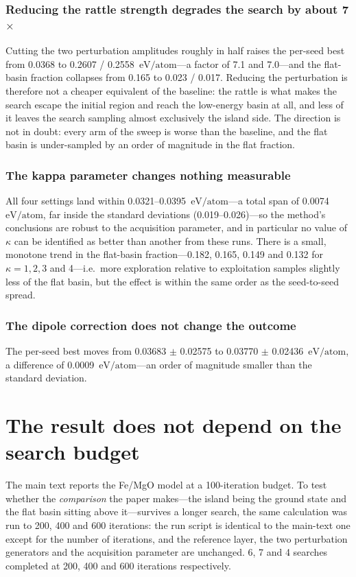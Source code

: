 \documentclass[10pt]{article}
\newcommand{\eVA}{\ensuremath{\text{eV/atom}}}
\begin{document}
\subsubsection{Reducing the rattle strength degrades the search by about 7$\times$} Cutting
the two perturbation amplitudes roughly in half raises the per-seed best from 0.0368 to
0.2607 / 0.2558~\eVA---a factor of 7.1 and 7.0---and the flat-basin fraction collapses from
0.165 to 0.023 / 0.017. Reducing the perturbation is therefore not a cheaper equivalent of
the baseline: the rattle is what makes the search escape the initial region and reach the low-energy
basin at all, and less of it leaves the search sampling almost exclusively the island side. The
direction is not in doubt: every arm of the sweep is worse than the baseline, and the flat basin is
under-sampled by an order of magnitude in the flat fraction.

\subsubsection{The kappa parameter changes nothing measurable} All four settings land within
0.0321--0.0395~\eVA---a total span of 0.0074~\eVA, far inside the standard deviations
(0.019--0.026)---so the method's conclusions are robust to the acquisition parameter, and in
particular no value of $\kappa$ can be identified as better than another from these runs.
There is a small, monotone trend in the flat-basin fraction---0.182, 0.165, 0.149 and 0.132 for
$\kappa = 1, 2, 3$ and 4---i.e.\ more exploration relative to exploitation samples slightly less of
the flat basin, but the effect is within the same order as the seed-to-seed spread.

\subsubsection{The dipole correction does not change the outcome} The per-seed best moves
from 0.03683 $\pm$ 0.02575 to 0.03770 $\pm$ 0.02436~\eVA, a difference of 0.0009~\eVA---an order of
magnitude smaller than the standard deviation.

\section{The result does not depend on the search budget}
\label{sec:S4}

The main text reports the Fe/MgO model at a 100-iteration budget. To test whether the
\emph{comparison} the paper makes---the island being the ground state and the flat basin sitting
above it---survives a longer search, the same calculation was run to 200, 400 and 600
iterations: the run script is identical to the main-text one except for the number of iterations, and
the reference layer, the two perturbation generators and the acquisition parameter are unchanged. 6,
7 and 4 searches completed at 200, 400 and 600 iterations respectively.
\end{document}

